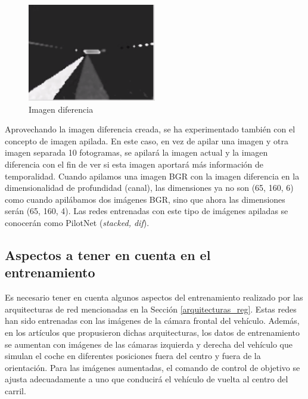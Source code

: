 \begin{figure}
\begin{center}
	\includegraphics[width=0.5\textwidth]{figures/Regresion/dif_gray_128.png}
   \caption{Imagen diferencia}
	\label{fig.diferencia_reg}
\end{center}
\end{figure}

Aprovechando la imagen diferencia creada, se ha experimentado también con el concepto de imagen apilada. En este caso, en vez de apilar una imagen y otra imagen separada 10 fotogramas, se apilará la imagen actual y la imagen diferencia con el fin de ver si esta imagen aportará más información de temporalidad. Cuando apilamos una imagen BGR con la imagen diferencia en la dimensionalidad de profundidad (canal), las dimensiones ya no son (65, 160, 6) como cuando apilábamos dos imágenes BGR, sino que ahora las dimensiones serán (65, 160, 4). Las redes entrenadas con este tipo de imágenes apiladas se conocerán como PilotNet (\textit{stacked, dif}). \\


\subsection{Aspectos a tener en cuenta en el entrenamiento}

Es necesario tener en cuenta algunos aspectos del entrenamiento realizado por las arquitecturas de red mencionadas en la Sección \ref{arquitecturas_reg}. Estas redes han sido entrenadas con las imágenes de la cámara frontal del vehículo. Además, en los artículos que propusieron dichas arquitecturas, los datos de entrenamiento se aumentan con imágenes de las cámaras izquierda y derecha del vehículo que simulan el coche en diferentes posiciones fuera del centro y fuera de la orientación. Para las imágenes aumentadas, el comando de control de objetivo se ajusta adecuadamente a uno que conducirá el vehículo de vuelta al centro del carril.\\

